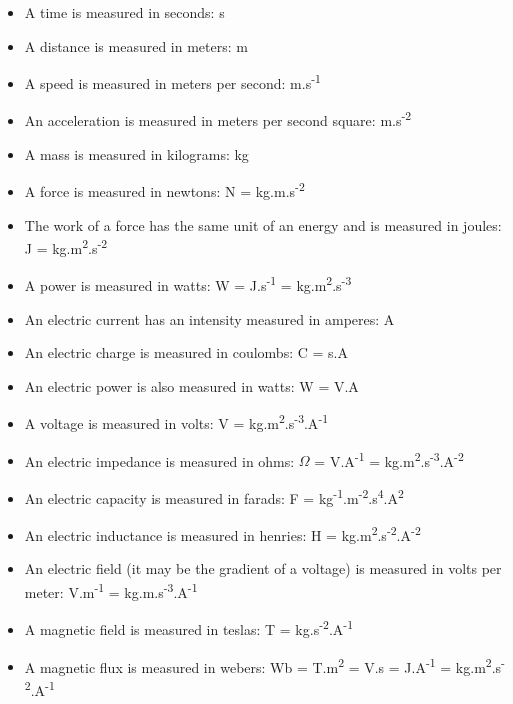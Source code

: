 \documentclass[a4paper,10pt]{article}
\begin{document}
\begin{itemize}
  \item A time is measured in seconds: s
  \item A distance is measured in meters: m
  \item A speed is measured in meters per second: m.s\textsuperscript{-1}
  \item An acceleration is measured in meters per second square: m.s\textsuperscript{-2}
  \item A mass is measured in kilograms: kg
  \item A force is measured in newtons: N = kg.m.s\textsuperscript{-2}
  \item The work of a force has the same unit of an energy and is measured in joules: J = kg.m\textsuperscript{2}.s\textsuperscript{-2}
  \item A power is measured in watts: W = J.s\textsuperscript{-1} = kg.m\textsuperscript{2}.s\textsuperscript{-3}
  \item An electric current has an intensity measured in amperes: A
  \item An electric charge is measured in coulombs: C = s.A
  \item An electric power is also measured in watts: W = V.A
  \item A voltage is measured in volts: V = kg.m\textsuperscript{2}.s\textsuperscript{-3}.A\textsuperscript{-1}
  \item An electric impedance is measured in ohms: $\Omega$ = V.A\textsuperscript{-1} = kg.m\textsuperscript{2}.s\textsuperscript{-3}.A\textsuperscript{-2}
  \item An electric capacity is measured in farads: F = kg\textsuperscript{-1}.m\textsuperscript{-2}.s\textsuperscript{4}.A\textsuperscript{2}
  \item An electric inductance is measured in henries: H = kg.m\textsuperscript{2}.s\textsuperscript{-2}.A\textsuperscript{-2}
  \item An electric field (it may be the gradient of a voltage) is measured in volts per meter: V.m\textsuperscript{-1} = kg.m.s\textsuperscript{-3}.A\textsuperscript{-1}
  \item A magnetic field is measured in teslas: T = kg.s\textsuperscript{-2}.A\textsuperscript{-1}
  \item A magnetic flux is measured in webers: Wb = T.m\textsuperscript{2} = V.s = J.A\textsuperscript{-1} = kg.m\textsuperscript{2}.s\textsuperscript{-2}.A\textsuperscript{-1}
\end{itemize}
\end{document}
